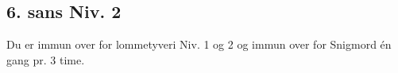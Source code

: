 \subsection{6. sans Niv. 2}
Du er immun over for lommetyveri Niv. 1 og 2 og immun over for Snigmord én gang pr. 3 time.\\